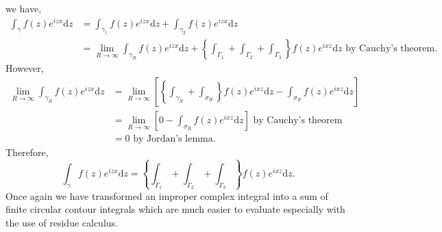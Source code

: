 we have,
\begin{align*}
\int_\gamma f(z) e^{izx} \mathrm{d}z &= \int_{\gamma_1} f(z) e^{izx} \mathrm{d}z + \int_{\gamma_2} f(z) e^{izx} \mathrm{d}z \\
&= \lim_{R\rightarrow \infty} \int_{\gamma_R} f(z) e^{izx} \mathrm{d}z + \left\{ \int_{\Gamma_1} + \int_{\Gamma_2} + \int_{\Gamma_3}\right\} f(z) e^{ixz} \mathrm{d}z \mbox{ by Cauchy's theorem}.
\end{align*}
However,
\begin{align*}
\lim_{R\rightarrow \infty} \int_{\gamma_R} f(z) e^{izx} \mathrm{d}z &= \lim_{R\rightarrow \infty}\left[\left\{\int_{\gamma_R} + \int_{\sigma_R}\right\} f(z) e^{ixz} \mathrm{d}z - \int_{\sigma_R} f(z) e^{ixz} \mathrm{d}z \right] \\
&= \lim_{R\rightarrow \infty}\left[ 0 - \int_{\sigma_R} f(z) e^{ixz} \mathrm{d}z \right] \mbox{ by Cauchy's theorem} \\
&= 0 \mbox{ by Jordan's lemma}.
\end{align*}
Therefore,
$$\int_\gamma f(z) e^{izx} \mathrm{d}z = \left\{ \int_{\Gamma_1} + \int_{\Gamma_2} + \int_{\Gamma_3}\right\} f(z) e^{ixz} \mathrm{d}z.$$
Once again we have transformed an improper complex integral into a sum of finite circular contour integrals which are much easier to evaluate especially with the use of residue calculus.